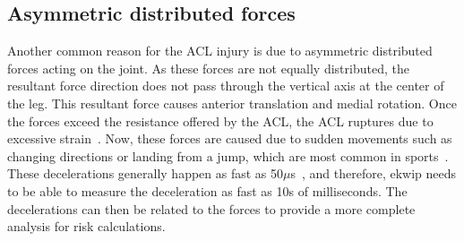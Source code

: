 \subsection{Asymmetric distributed forces}
Another common reason for the ACL injury is due to asymmetric distributed forces acting on the joint. As these forces are not equally distributed, the resultant force direction does not pass through the vertical axis at the center of the leg. This resultant force causes anterior translation and medial rotation. Once the forces exceed the resistance offered by the ACL,  the ACL ruptures due to excessive strain~\cite{griffin}. Now, these forces are caused due to sudden movements such as changing directions or landing from a jump, which are most common in sports~\cite{griffin}. These decelerations generally happen as fast as 50$\mu$s~\cite{Shin20071145}, and therefore, ekwip needs to be able to measure the deceleration as fast as 10s of milliseconds. The decelerations can then be related to the forces to provide a more complete analysis for risk calculations.